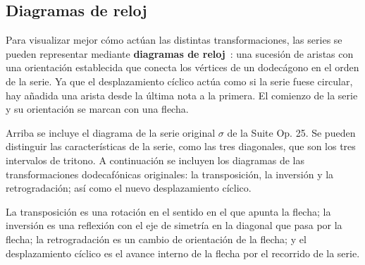 %	
%	
%	
%	
%	
%	
%	
%	
%	
%	
%	
%	
%

	\subsection{Diagramas de reloj}
	
		Para visualizar mejor c\'omo act\'uan las distintas transformaciones, las series se pueden representar mediante \textbf{diagramas de reloj}~\cite{hunter}: una sucesi\'on de aristas con una orientaci\'on establecida que conecta los v\'ertices de un dodec\'agono en el orden de la serie. Ya que el desplazamiento c\'iclico act\'ua como si la serie fuese circular, hay a\~nadida una arista desde la \'ultima nota a la primera. El comienzo de la serie y su orientaci\'on se marcan con una flecha.
		
		\begin{figure}[h]
			\begin{center}				
			\end{center}
		\end{figure} 
		
		Arriba se incluye el diagrama de la serie original $\sigma$ de la Suite Op. 25. Se pueden distinguir las caracter\'isticas de la serie, como las tres diagonales, que son los tres intervalos de tritono. A continuaci\'on se incluyen los diagramas de las transformaciones dodecaf\'onicas originales: la transposici\'on, la inversi\'on y la retrogradaci\'on; as\'i como el nuevo desplazamiento c\'iclico.
		
	\begin{center}
		\begin{multicols}{4}
	\end{multicols}
	\end{center}
		
		La transposici\'on es una rotaci\'on en el sentido en el que apunta la flecha; la inversi\'on es una reflexi\'on con el eje de simetr\'ia en la diagonal que pasa por la flecha; la retrogradaci\'on es un cambio de orientaci\'on de la flecha; y el desplazamiento c\'iclico es el avance interno de la flecha por el recorrido de la serie.		
		
